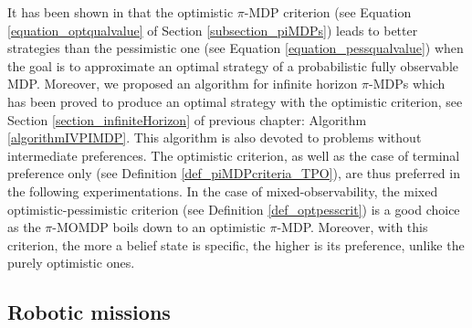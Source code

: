 It has been shown in \cite{conf/ecai/Sabbadi00} that 
the optimistic $\pi$-MDP criterion 
(see Equation \ref{equation_optqualvalue} of Section \ref{subsection_piMDPs}) 
leads to better strategies than the pessimistic one 
(see Equation \ref{equation_pessqualvalue})
when the goal is to approximate 
an optimal strategy of a probabilistic 
fully observable MDP. 
Moreover, we proposed an algorithm for infinite horizon $\pi$-MDPs 
which has been proved to produce an optimal strategy 
with the optimistic criterion,
see Section \ref{section_infiniteHorizon} of previous chapter: 
Algorithm \ref{algorithmIVPIMDP}. 
This algorithm is also devoted to problems without intermediate preferences.
The optimistic criterion, as well as the case of terminal preference only (see Definition \ref{def_piMDPcriteria_TPO}), 
are thus preferred in the following experimentations.
In the case of mixed-observability, 
the mixed optimistic-pessimistic criterion (see Definition \ref{def_optpesscrit}) 
is a good choice as the $\pi$-MOMDP boils down to an optimistic $\pi$-MDP.
Moreover, with this criterion, the more a belief state is specific, the higher is its preference, unlike the purely optimistic ones.


\subsection{Robotic missions}

